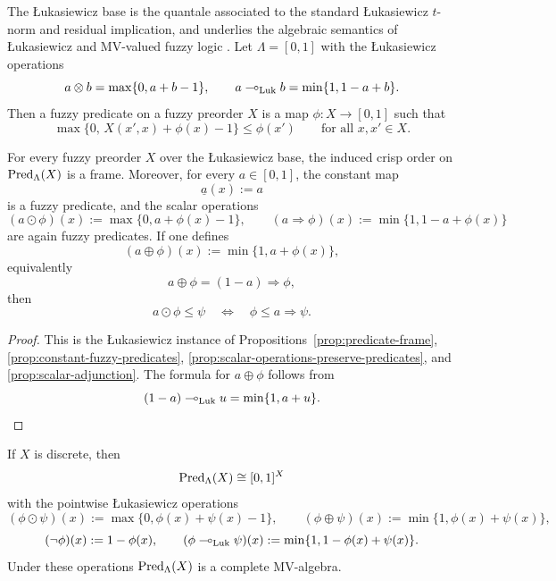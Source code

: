 The {\L}ukasiewicz base is the quantale associated to the standard {\L}ukasiewicz \(t\)-norm and residual implication, and underlies the algebraic semantics of {\L}ukasiewicz and MV-valued fuzzy logic \cite[Example~2.4]{stubbe-2014-quantaloid-enriched} \cite{cintula-hajek-noguera-2011-hmfl1}. Let \(\Lambda=[0,1]\) with the {\L}ukasiewicz operations
\[
    a\otimes b=\max\{0,a+b-1\},
    \qquad
    a\multimap_{\mathrm{Luk}} b=\min\{1,1-a+b\}.
\]
Then a fuzzy predicate on a fuzzy preorder \(X\) is a map \(\phi:X\to [0,1]\) such that
\[
    \max\{0,\,X(x',x)+\phi(x)-1\}\leq \phi(x')
    \qquad
    \text{for all }x,x'\in X.
\]

\begin{proposition}
\label{prop:lukasiewicz-predicate-algebra}
    For every fuzzy preorder \(X\) over the {\L}ukasiewicz base, the induced crisp order on \(\mathrm{Pred}_\Lambda(X)\) is a frame. Moreover, for every \(a\in [0,1]\), the constant map
    \[
        \underline{a}(x):=a
    \]
    is a fuzzy predicate, and the scalar operations
    \[
        (a\odot \phi)(x):=\max\{0,a+\phi(x)-1\},
        \qquad
        (a\Rightarrow \phi)(x):=\min\{1,1-a+\phi(x)\}
    \]
    are again fuzzy predicates. If one defines
    \[
        (a\oplus \phi)(x):=\min\{1,a+\phi(x)\},
    \]
    equivalently
    \[
        a\oplus \phi=(1-a)\Rightarrow \phi,
    \]
    then
    \[
        a\odot \phi\leq \psi
        \quad\Longleftrightarrow\quad
        \phi\leq a\Rightarrow \psi.
    \]
\end{proposition}

\begin{proof}
    This is the {\L}ukasiewicz instance of Propositions~\ref{prop:predicate-frame}, \ref{prop:constant-fuzzy-predicates}, \ref{prop:scalar-operations-preserve-predicates}, and \ref{prop:scalar-adjunction}. The formula for \(a\oplus\phi\) follows from
    \[
        (1-a)\multimap_{\mathrm{Luk}} u=\min\{1,a+u\}.
    \]
\end{proof}

\begin{corollary}
\label{cor:lukasiewicz-discrete-predicate-algebra}
    If \(X\) is discrete, then
    \[
        \mathrm{Pred}_\Lambda(X)\cong [0,1]^X
    \]
    with the pointwise {\L}ukasiewicz operations
    \[
        (\phi\odot\psi)(x):=\max\{0,\phi(x)+\psi(x)-1\},
        \qquad
        (\phi\oplus\psi)(x):=\min\{1,\phi(x)+\psi(x)\},
    \]
    \[
        (\neg\phi)(x):=1-\phi(x),
        \qquad
        (\phi\multimap_{\mathrm{Luk}}\psi)(x)
        :=
        \min\{1,1-\phi(x)+\psi(x)\}.
    \]
    Under these operations \(\mathrm{Pred}_\Lambda(X)\) is a complete MV-algebra.
\end{corollary}


